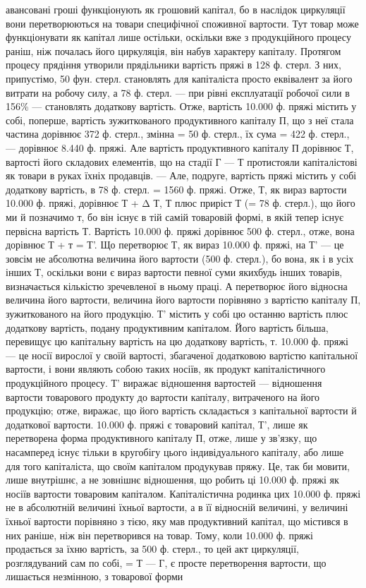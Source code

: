 авансовані гроші функціонують як грошовий капітал, бо в наслідок
циркуляції вони перетворюються на товари специфічної споживної
вартости. Тут товар може функціонувати як капітал лише остільки,
оскільки вже з продукційного процесу раніш, ніж почалась його циркуляція,
він набув характеру капіталу. Протягом процесу прядіння утворили
прядільники вартість пряжі в 128 ф. стерл. З них, припустімо, 50 фун.
стерл. становлять для капіталіста просто еквівалент за його витрати на
робочу силу, а 78 ф. стерл. — при рівні експлуатації робочої сили в 156\%
— становлять додаткову вартість. Отже, вартість 10.000 ф. пряжі містить у
собі, поперше, вартість зужиткованого продуктивного капіталу П, що з неї
стала частина дорівнює 372 ф. стерл., змінна = 50 ф. стерл., їх
сума = 422 ф. стерл., — дорівнює 8.440 ф. пряжі. Але вартість
продуктивного капіталу П дорівнює Т, вартості його складових елементів,
що на стадії Г — Т протистояли капіталістові як товари в руках їхніх
продавців. — Але, подруге, вартість пряжі містить у собі додаткову вартість,
в 78 ф. стерл. = 1560 ф. пряжі. Отже, Т, як вираз вартости 10.000 ф.
пряжі, дорівнює Т + Δ Т, Т плюс приріст Т (= 78 ф. стерл.), що його ми й
позначимо т, бо він існує в тій самій товаровій формі, в якій тепер існує
первісна вартість Т. Вартість 10.000 ф. пряжі дорівнює 500 ф. стерл., отже,
вона дорівнює Т + т = Т'. Що перетворює Т, як вираз 10.000 ф. пряжі, на
Т' — це зовсім не абсолютна величина його вартости (500 ф. стерл.), бо вона,
як і в усіх інших Т, оскільки вони є вираз вартости певної суми якихбудь
інших товарів, визначається кількістю зречевленої в ньому праці.
А перетворює його відносна величина його вартости, величина його
вартости порівняно з вартістю капіталу П, зужиткованого на його
продукцію. Т' містить у собі цю останню вартість плюс додаткову
вартість, подану продуктивним капіталом. Його вартість більша, перевищує
цю капітальну вартість на цю додаткову вартість, т. 10.000 ф.
пряжі — це носії вирослої у своїй вартості, збагаченої додатковою вартістю
капітальної вартости, і вони являють собою таких носіїв, як
продукт капіталістичного продукційного процесу. Т' виражає відношення
вартостей — відношення вартости товарового продукту до
вартости капіталу, витраченого на його продукцію; отже, виражає, що
його вартість складається з капітальної вартости й додаткової вартости.
10.000 ф. пряжі є товаровий капітал, Т', лише як перетворена форма
продуктивного капіталу П, отже, лише у зв’язку, що насамперед існує
тільки в кругобігу цього індивідуального капіталу, або лише для того
капіталіста, що своїм капіталом продукував пряжу. Це, так би мовити,
лише внутрішнє, а не зовнішнє відношення, що робить ці 10.000 ф.
пряжі як носіїв вартости товаровим капіталом. Капіталістична родинка
цих 10.000 ф. пряжі не в абсолютній величині їхньої вартости, а в її відносній
величині, у величині їхньої вартости порівняно з тією, яку мав
продуктивний капітал, що містився в них раніше, ніж він перетворився
на товар. Тому, коли 10.000 ф. пряжі продається за їхню вартість, за
500 ф. стерл., то цей акт циркуляції, розглядуваний сам по собі, = Т — Г,
є просте перетворення вартости, що лишається незмінною, з товарової форми

